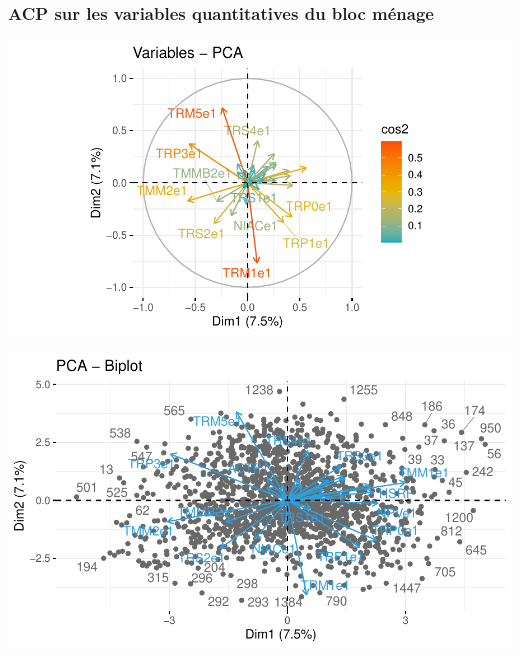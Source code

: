 \documentclass[11pt,a4paper, x11names]{article}\usepackage[]{graphicx}\usepackage[]{color}
\makeatletter
\def\maxwidth{ %
  \ifdim\Gin@nat@width>\linewidth
    \linewidth
  \else
    \Gin@nat@width
  \fi
}
\newenvironment{knitrout}{}{} %
\makeatother
\begin{document}
\subsubsection{ACP sur les variables quantitatives du bloc ménage}
\begin{minipage}{0.49\linewidth}
\begin{mdframed}
\begin{knitrout}
\color{fgcolor}
\includegraphics[width=\maxwidth]{figure/unnamed-chunk-9-1} 
\end{knitrout}
\end{mdframed}
\end{minipage}
\hfill
\begin{minipage}{0.49\linewidth}
\begin{mdframed}
\begin{knitrout}
\color{fgcolor}
\includegraphics[width=\maxwidth]{figure/unnamed-chunk-10-1} 
\end{knitrout}
\end{mdframed}
\end{minipage}
\end{document}
